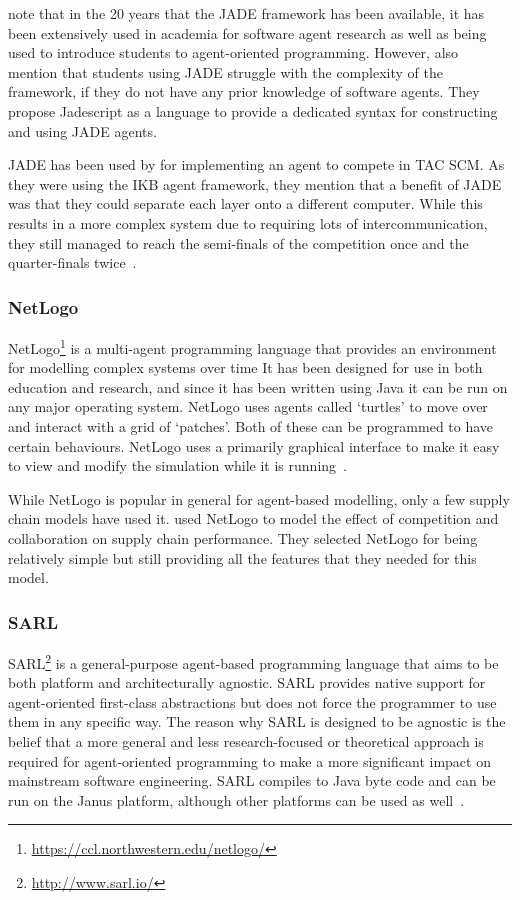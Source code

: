  note that in the 20 years that the JADE framework has been available, it has been extensively used in academia for software agent research as well as being used to introduce students to agent-oriented programming.
However,  also mention that students using JADE struggle with the complexity of the framework, if they do not have any prior knowledge of software agents.
They propose Jadescript as a language to provide a dedicated syntax for constructing and using JADE agents.

JADE has been used by  for implementing an agent to compete in TAC SCM\@.
As they were using the IKB agent framework, they mention that a benefit of JADE was that they could separate each layer onto a different computer.
While this results in a more complex system due to requiring lots of intercommunication, they still managed to reach the semi-finals of the competition once and the quarter-finals twice~\cite{collins2009flexible}.

\subsubsection{NetLogo}

NetLogo\footnote{\url{https://ccl.northwestern.edu/netlogo/}} is a multi-agent programming language that provides an environment for modelling complex systems over time
It has been designed for use in both education and research, and since it has been written using Java it can be run on any major operating system.
NetLogo uses agents called `turtles' to move over and interact with a grid of `patches'.
Both of these can be programmed to have certain behaviours.
NetLogo uses a primarily graphical interface to make it easy to view and modify the simulation while it is running~\cite{tisue2004netlogo}.

While NetLogo is popular in general for agent-based modelling, only a few supply chain models have used it.
 used NetLogo to model the effect of competition and collaboration on supply chain performance.
They selected NetLogo for being relatively simple but still providing all the features that they needed for this model.

\subsubsection{SARL}

SARL\footnote{\url{http://www.sarl.io/}} is a general-purpose agent-based programming language that aims to be both platform and architecturally agnostic.
SARL provides native support for agent-oriented first-class abstractions but does not force the programmer to use them in any specific way.
The reason why SARL is designed to be agnostic is the belief that a more general and less research-focused or theoretical approach is required for agent-oriented programming to make a more significant impact on mainstream software engineering.
SARL compiles to Java byte code and can be run on the Janus platform, although other platforms can be used as well~\cite{rodriguez2014sarl}.

